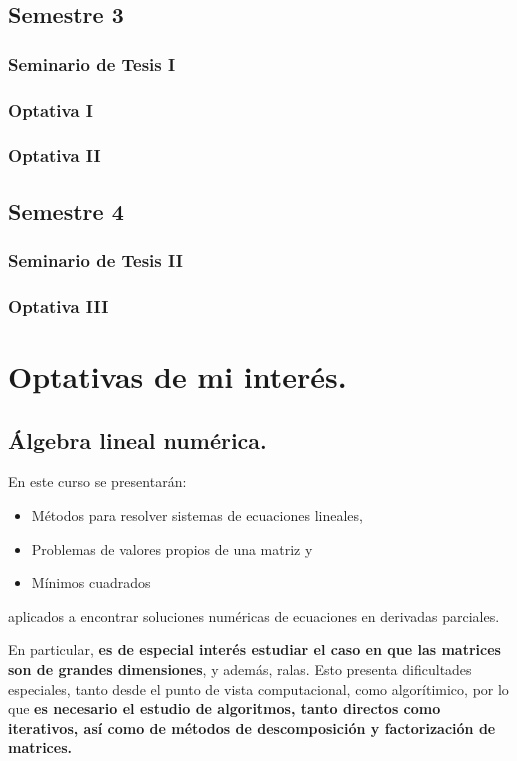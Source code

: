 \documentclass[10pt,a4paper]{article}
\begin{document}
\subsection{Semestre 3}
\subsubsection{Seminario de Tesis I}
\subsubsection{Optativa I}
\subsubsection{Optativa II}
\subsection{Semestre 4}
\subsubsection{Seminario de Tesis II}
\subsubsection{Optativa III}

\newpage
\section{Optativas de mi interés.}
\subsection{Álgebra lineal numérica.}
En este curso se presentarán:
\begin{itemize}
	\item Métodos para resolver sistemas de ecuaciones lineales,
	\item Problemas de valores propios de una matriz y
	\item Mínimos cuadrados
\end{itemize}
aplicados a encontrar soluciones numéricas de ecuaciones en derivadas parciales. 

En particular, \textbf{es de especial interés estudiar el caso en que las matrices son de grandes dimensiones}, y además, ralas. Esto presenta dificultades especiales, tanto desde el punto de vista computacional, como algorítimico, por lo que\textbf{ es necesario el estudio de algoritmos, tanto directos como iterativos, así como de métodos de descomposición y factorización de matrices.}
\newpage
\end{document}
